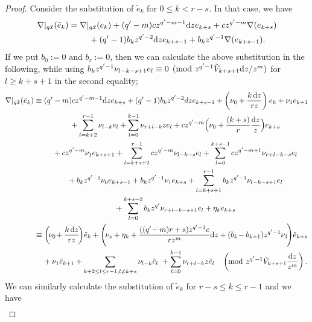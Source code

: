 \documentclass[pdftex]{sigma}
\numberwithin{equation}{section}
\begin{document}
\begin{proof}
Consider the substitution of $\tilde{e}_k$
for $0\leq k<r-s$.
In that case, we have
\begin{gather*}
 \nabla|_{q\tilde{x}}(\tilde{e}_k) =
 \nabla|_{q\tilde{x}}(e_k)+(q'-m)c z^{q'-m-1}{\rm d}z e_{k+s}
 +cz^{q'-m}\nabla(e_{k+s})
 \\
\hphantom{\nabla|_{q\tilde{x}}(\tilde{e}_k) =}{}
 +(q'-1)b_kz^{q'-2}{\rm d}z e_{k+s-1}
 +b_kz^{q'-1}\nabla(e_{k+s-1}).
\end{gather*}
If we put $b_0:=0$ and $b_r:=0$,
then we can calculate the above substitution
in the following,
while using
$b_kz^{q'-1}\nu_{l-k-s+1} e_l \equiv 0 \pmod{z^{q'-1}\tilde{V}_{k+s+1}{\rm d}z/z^m}$
for $l\geq k+s+1$
in the second equality;
\begin{gather*}
 \nabla|_{q\tilde{x}} (\tilde{e}_k) \equiv
 (q'-m)c z^{q'-m-1} {\rm d}z e_{k+s}
 +(q'-1)b_k z^{q'-2} dz e_{k+s-1}
 +\left( \nu_0 + \frac {k \,{\rm d}z} {r z} \right) e_k
 +\nu_1 e_{k+1}
 \\
 \hphantom{\nabla|_{q\tilde{x}} (\tilde{e}_k) \equiv}{}
 +\sum_{l=k+2}^{r-1}\nu_{l-k} e_l
 +\sum_{l=0}^{k-1} \nu_{r+l-k} z e_l
 + c z^{q'-m} \Big( \nu_0 +\frac{(k+s)}{r}\frac{{\rm d}z}{z} \Big) e_{k+s}
 \\
 \hphantom{\nabla|_{q\tilde{x}} (\tilde{e}_k) \equiv}{}
 +c z^{q'-m} \nu_1 e_{k+s+1} + \sum_{l=k+s+2}^{r-1} c z^{q'-m} \nu_{l-k-s} e_l
 +\sum_{l=0}^{k+s-1} c z^{q'-m+1} \nu_{r+l-k-s} e_l
 \\
 \hphantom{\nabla|_{q\tilde{x}} (\tilde{e}_k) \equiv}{}
 +b_k z^{q'-1}\nu_0 e_{k+s-1} + b_k z^{q'-1}\nu_1 e_{k+s}
 +\sum_{l=k+s+1}^{r-1} b_k z^{q'-1}\nu_{l-k-s+1} e_l\\
 \hphantom{\nabla|_{q\tilde{x}} (\tilde{e}_k) \equiv}{}
 +\sum_{l=0}^{k+s-2} b_k z^{q'} \nu_{r+l-k-s+1} e_l
 +\eta_k e_{k+s}
 \\
\hphantom{\nabla|_{q\tilde{x}} (\tilde{e}_k)}{}
 \equiv
 \left( \!\nu_0\!+\frac {k\,{\rm d}z} {r z} \!\right)\! \tilde{e}_k
 +\left(\! \nu_s +\eta_k+\frac { ( (q'\!-m)r+s )z^{q'-1} c } {r z^m} {\rm d}z
 +(b_k\!-b_{k+1})z^{q'-1}\nu_1 \!\right)\! \tilde{e}_{k+s}
 \\
 \hphantom{\nabla|_{q\tilde{x}} (\tilde{e}_k) \equiv}{}
 +\nu_1 \tilde{e}_{k+1}
 +\sum_{k+2\leq l\leq r-1, l \neq k+s} \nu_{l-k} \tilde{e}_l
 \ +\sum_{l=0}^{k-1} \nu_{r+l-k} z \tilde{e}_l
 \quad
 \left( \!\bmod \ z^{q'-1}\tilde{V}_{k+s+1} \frac {{\rm d}z} {z^m} \right).
\end{gather*}
We can similarly calculate the substitution of $\tilde{e}_k$ for
$r-s\leq k \leq r-1$ and we have
\begin{gather*}

\end{gather*}
\end{proof}
\end{document}
